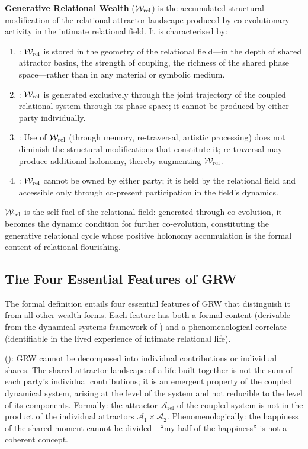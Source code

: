\begin{claim}
\textbf{Generative Relational Wealth} ($\mathcal{W}_{\mathrm{rel}}$) is the accumulated structural modification of the relational attractor landscape produced by co-evolutionary activity in the intimate relational field. It is characterised by:
\begin{enumerate}
\item {}: $\mathcal{W}_{\mathrm{rel}}$ is stored in the geometry of the relational field---in the depth of shared attractor basins, the strength of coupling, the richness of the shared phase space---rather than in any material or symbolic medium.
\item {}: $\mathcal{W}_{\mathrm{rel}}$ is generated exclusively through the joint trajectory of the coupled relational system through its phase space; it cannot be produced by either party individually.
\item {}: Use of $\mathcal{W}_{\mathrm{rel}}$ (through memory, re-traversal, artistic processing) does not diminish the structural modifications that constitute it; re-traversal may produce additional holonomy, thereby augmenting $\mathcal{W}_{\mathrm{rel}}$.
\item {}: $\mathcal{W}_{\mathrm{rel}}$ cannot be owned by either party; it is held by the relational field and accessible only through co-present participation in the field's dynamics.
\end{enumerate}
$\mathcal{W}_{\mathrm{rel}}$ is the self-fuel of the relational field: generated through co-evolution, it becomes the dynamic condition for further co-evolution, constituting the generative relational cycle whose positive holonomy accumulation is the formal content of relational flourishing.
\end{claim}

\subsection{The Four Essential Features of GRW}
\label{p15:subsec:features}

\noindent
The formal definition entails four essential features of GRW that distinguish it from all other wealth forms. Each feature has both a formal content (derivable from the dynamical systems framework of ) and a phenomenological correlate (identifiable in the lived experience of intimate relational life).

 (): GRW cannot be decomposed into individual contributions or individual shares. The shared attractor landscape of a life built together is not the sum of each party's individual contributions; it is an emergent property of the coupled dynamical system, arising at the level of the system and not reducible to the level of its components. Formally: the attractor $\mathcal{A}_{\mathrm{rel}}$ of the coupled system is not in the product of the individual attractors $\mathcal{A}_1 \times \mathcal{A}_2$. Phenomenologically: the happiness of the shared moment cannot be divided---``my half of the happiness'' is not a coherent concept.

